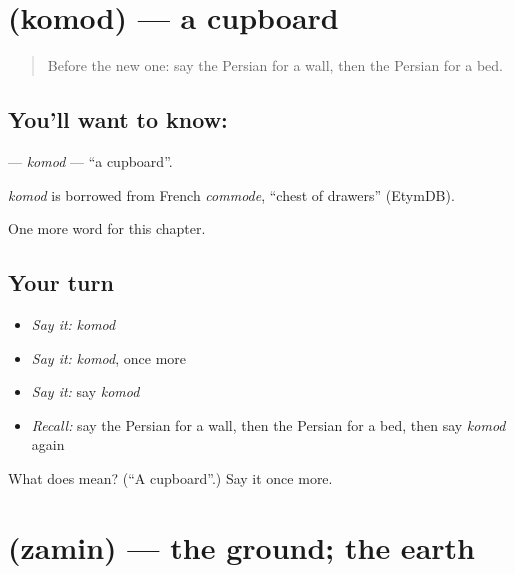 \section[\texorpdfstring{\fa{کمد} (komod)}{کمد (komod)}]{ (komod) — a cupboard}

\label{lesson:FA-C46-komod}



\begin{quote}
Before the new one: say the Persian for a wall, then the Persian for a bed.
\end{quote}

\subsection*{You'll want to know: }
\textbf{} — \emph{komod} — \textquotedblleft{}a cupboard\textquotedblright{}.

\begin{cousinweb}
\emph{komod} is borrowed from French \emph{commode}, \textquotedblleft{}chest of drawers\textquotedblright{} (EtymDB).
\end{cousinweb}

\begin{grammarlens}[title={What you've built}]
One more word for this chapter.
\end{grammarlens}

\subsection*{Your turn}
\begin{itemize}
\raggedright
  \item \emph{Say it:} \emph{komod}
  \item \emph{Say it:} \emph{komod}, once more
  \item \emph{Say it:} say \emph{komod}
  \item \emph{Recall:} say the Persian for a wall, then the Persian for a bed, then say \emph{komod} again
\end{itemize}

\begin{tcolorbox}[breakable,colback=teal!4,colframe=teal!35!black,title={Before you move on}]
What does  mean? (\textquotedblleft{}A cupboard\textquotedblright{}.) Say it once more.
\end{tcolorbox}
\section[\texorpdfstring{\fa{زمین} (zamin)}{زمین (zamin)}]{ (zamin) — the ground; the earth}

